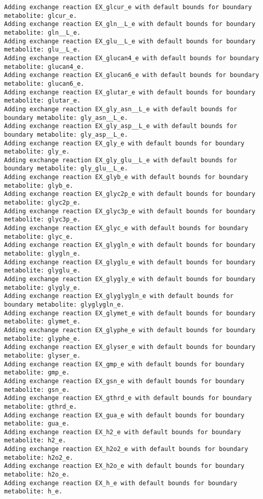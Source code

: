 \documentclass[
  letterpaper,
  DIV=11,
  numbers=noendperiod]{scrartcl}
\begin{document}
\begin{verbatim}
Adding exchange reaction EX_glcur_e with default bounds for boundary metabolite: glcur_e.
Adding exchange reaction EX_gln__L_e with default bounds for boundary metabolite: gln__L_e.
Adding exchange reaction EX_glu__L_e with default bounds for boundary metabolite: glu__L_e.
Adding exchange reaction EX_glucan4_e with default bounds for boundary metabolite: glucan4_e.
Adding exchange reaction EX_glucan6_e with default bounds for boundary metabolite: glucan6_e.
Adding exchange reaction EX_glutar_e with default bounds for boundary metabolite: glutar_e.
Adding exchange reaction EX_gly_asn__L_e with default bounds for boundary metabolite: gly_asn__L_e.
Adding exchange reaction EX_gly_asp__L_e with default bounds for boundary metabolite: gly_asp__L_e.
Adding exchange reaction EX_gly_e with default bounds for boundary metabolite: gly_e.
Adding exchange reaction EX_gly_glu__L_e with default bounds for boundary metabolite: gly_glu__L_e.
Adding exchange reaction EX_glyb_e with default bounds for boundary metabolite: glyb_e.
Adding exchange reaction EX_glyc2p_e with default bounds for boundary metabolite: glyc2p_e.
Adding exchange reaction EX_glyc3p_e with default bounds for boundary metabolite: glyc3p_e.
Adding exchange reaction EX_glyc_e with default bounds for boundary metabolite: glyc_e.
Adding exchange reaction EX_glygln_e with default bounds for boundary metabolite: glygln_e.
Adding exchange reaction EX_glyglu_e with default bounds for boundary metabolite: glyglu_e.
Adding exchange reaction EX_glygly_e with default bounds for boundary metabolite: glygly_e.
Adding exchange reaction EX_glyglygln_e with default bounds for boundary metabolite: glyglygln_e.
Adding exchange reaction EX_glymet_e with default bounds for boundary metabolite: glymet_e.
Adding exchange reaction EX_glyphe_e with default bounds for boundary metabolite: glyphe_e.
Adding exchange reaction EX_glyser_e with default bounds for boundary metabolite: glyser_e.
Adding exchange reaction EX_gmp_e with default bounds for boundary metabolite: gmp_e.
Adding exchange reaction EX_gsn_e with default bounds for boundary metabolite: gsn_e.
Adding exchange reaction EX_gthrd_e with default bounds for boundary metabolite: gthrd_e.
Adding exchange reaction EX_gua_e with default bounds for boundary metabolite: gua_e.
Adding exchange reaction EX_h2_e with default bounds for boundary metabolite: h2_e.
Adding exchange reaction EX_h2o2_e with default bounds for boundary metabolite: h2o2_e.
Adding exchange reaction EX_h2o_e with default bounds for boundary metabolite: h2o_e.
Adding exchange reaction EX_h_e with default bounds for boundary metabolite: h_e.

\end{verbatim}
\end{document}
